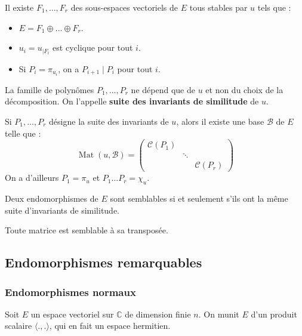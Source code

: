 	\begin{theorem}
		Il existe $F_1, \dots, F_r$ des sous-espaces vectoriels de $E$ tous stables par $u$ tels que :
		\begin{itemize}
			\item $E = F_1 \oplus \dots \oplus F_r$.
			\item $u_i = u_{|F_i}$ est cyclique pour tout $i$.
			\item Si $P_i = \pi_{u_i}$, on a $P_{i+1} \mid P_i$ pour tout $i$.
		\end{itemize}
		La famille de polynômes $P_1, \dots, P_r$ ne dépend que de $u$ et non du choix de la décomposition. On l'appelle \textbf{suite des invariants de similitude} de $u$.
	\end{theorem}

	\begin{theorem}
		Si $P_1, \dots, P_r$ désigne la suite des invariants de $u$, alors il existe une base $\mathcal{B}$ de $E$ telle que :
		\[ \operatorname{Mat}(u, \mathcal{B}) = \begin{pmatrix} \mathcal{C}(P_1) & & \\ & \ddots & \\ & & \mathcal{C}(P_r) \end{pmatrix} \]
		On a d'ailleurs $P_1 = \pi_u$ et $P_1 \dots P_r = \chi_u$.
	\end{theorem}

	\begin{corollary}
		Deux endomorphismes de $E$ sont semblables si et seulement s'ils ont la même suite d'invariants de similitude.
	\end{corollary}

	\begin{application}
		Toute matrice est semblable à sa transposée.
	\end{application}

	\subsection{Endomorphismes remarquables}

	\subsubsection{Endomorphismes normaux}

	Soit $E$ un espace vectoriel sur $\mathbb{C}$ de dimension finie $n$. On munit $E$ d'un produit scalaire $\langle . , . \rangle$, qui en fait un espace hermitien.

